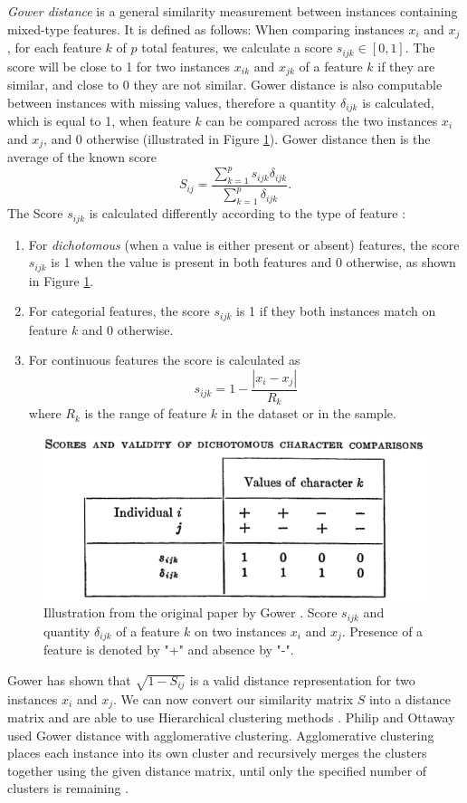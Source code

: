 \textit{Gower distance} \cite{gower} is a general similarity measurement between instances containing mixed-type features. It is defined as follows: When comparing instances $x_i$ and $x_j$, for each feature $k$ of $p$ total features, we calculate a score $s_{ijk} \in [0,1]$. The score will be close to 1 for two instances $x_{ik}$ and $x_{jk}$ of a feature $k$ if they are similar, and close to 0 they are not similar.
Gower distance is also computable between instances with missing values, therefore a quantity $\delta_{ijk}$ is calculated, which is equal to 1, when feature $k$ can be compared across the two instances $x_i$ and $x_j$, and 0 otherwise (illustrated in Figure \ref{gower_dichotomous}).
Gower distance then is the average of the known score
$$S_{ij} = \frac{\sum^p_{k=1}s_{ijk}\delta_{ijk}}{\sum^p_{k=1}\delta_{ijk}}.$$
The Score $s_{ijk}$ is calculated differently according to the type of feature \cite{gower}:
\begin{enumerate}
	\item For \textit{dichotomous} (when a value is either present or absent) features, the score $s_{ijk}$ is 1 when the value is present in both features and 0 otherwise, as shown in Figure \ref{gower_dichotomous}.
	\item For categorial features, the score $s_{ijk}$ is 1 if they both instances match on feature $k$ and 0 otherwise.
	\item For continuous features the score is calculated as
	$$s_{ijk} = 1-\frac{|x_i-x_j|}{R_k}$$
	where $R_k$ is the range of feature $k$ in the dataset or in the sample.
\end{enumerate}
\begin{figure}
\centering
	\includegraphics[width=\linewidth]{gower-dichotomous.png}
	\caption{Illustration from the original paper by Gower \cite{gower}. Score $s_{ijk}$ and quantity $\delta_{ijk}$ of a feature $k$ on two instances $x_i$ and $x_j$. Presence of a feature is denoted by "+" and absence by "-".}
	\label{gower_dichotomous}
\end{figure}
Gower \cite{gower} has shown that $\sqrt{1- S_{ij}}$ is a valid distance representation for two instances $x_i$ and $x_j$. We can now convert our similarity matrix $S$ into a distance matrix and are able to use Hierarchical clustering methods \cite{algorithms_for_clustering_data}. Philip and Ottaway \cite{philip_ottaway} used Gower distance with agglomerative clustering. Agglomerative clustering places each instance into its own cluster and recursively merges the clusters together using the given distance matrix, until only the specified number of clusters is remaining \cite{algorithms_for_clustering_data}.

